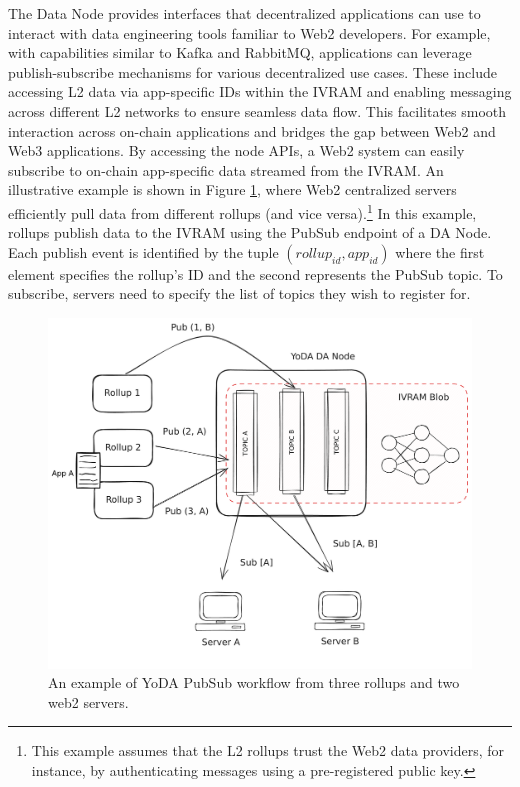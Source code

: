 \documentclass[11pt]{article}
\begin{document}
The Data Node provides interfaces that decentralized applications can use to interact with data engineering tools familiar to Web2 developers. For example, with capabilities similar to Kafka and RabbitMQ, applications can leverage publish-subscribe mechanisms for various decentralized use cases. These include accessing L2 data via app-specific IDs within the IVRAM and enabling messaging across different L2 networks to ensure seamless data flow. This facilitates smooth interaction across on-chain applications and bridges the gap between Web2 and Web3 applications. By accessing the node APIs, a Web2 system can easily subscribe to on-chain app-specific data streamed from the IVRAM.
%
An illustrative example is shown in Figure \ref{fig:yoda-interface}, where Web2 centralized servers efficiently pull data from different rollups (and vice versa).\footnote{This example assumes that the L2 rollups trust the Web2 data providers, for instance, by authenticating messages using a pre-registered public key.} In this example, rollups publish data to the IVRAM using the PubSub endpoint of a DA Node. Each publish event is identified by the tuple $(rollup_{id}, app_{id})$ where the first element specifies the rollup's ID and the second represents the PubSub topic. To subscribe, servers need to specify the list of topics they wish to register for.

\begin{figure}[htp]
    \centering
    \includegraphics[scale=0.2]{we2-web3 (1).pdf}
    \caption{An example of YoDA PubSub workflow from three rollups and two web2 servers.}
    \label{fig:yoda-interface}
\end{figure}
\end{document}
